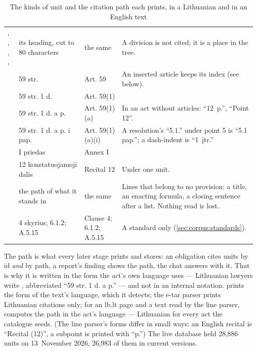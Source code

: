 \begin{table}[H]
\caption{The kinds of unit and the citation path each prints, in a Lithuanian and in an English text}\label{tab:corpus:units}
\begin{tabularx}{\textwidth}{@{}L{32mm}L{40mm}L{33mm}Y@{}}
\toprule
{} &  &  &  \\
\midrule
{}, , , ,  & its heading, cut to 80 characters & the same & A division is not cited; it is a place in the tree. \\
 & 59 str. & Art. 59 & An inserted article keeps its index (see below). \\
 & 59 str. 1 d. & Art. 59(1) & \\
 & 59 str. 1 d. a p. & Art. 59(1)(a) & In an act without articles: \enquote{12~p.}, \enquote{Point 12}. \\
 & 59 str. 1 d. a p. i pap. & Art. 59(1)(a)(i) & A resolution's \enquote{5.1.} under point 5 is \enquote{5.1 pap.}; a dash-indent is \enquote{1~įtr.} \\
 & I priedas & Annex I & \\
 & 12 konstatuojamoji dalis & Recital 12 & Under one  unit. \\
 & the path of what it stands in & the same & Lines that belong to no provision: a title, an enacting formula, a closing sentence after a list. Nothing read is lost. \\
 & 4 skyrius; 6.1.2; A.5.15 & Clause 4; 6.1.2; A.5.15 & A standard only (\cref{sec:corpus:standards}). \\
\bottomrule
\end{tabularx}
\end{table}

The path is what every later stage prints and stores: an obligation cites units by id
\emph{and} by path, a report's finding shows the path, the chat answers with it. That is why
it is written in the form the act's own language uses --- Lithuanian lawyers write
, abbreviated \enquote{59 str. 1 d. a p.} --- and not in
an internal notation.  prints the form of the text's language, which it
detects; the e-tar parser prints Lithuanian citations only; for an lb.lt page and a text read
by the line parser,  computes the path in the act's language --- Lithuanian
for every act the catalogue seeds. (The line parser's forms differ in small ways: an English
recital is \enquote{Recital (12)}, a subpoint is printed with \enquote{p.}) The live
database held 28,886 units on 13~November 2026, 26,983 of them in current versions.

